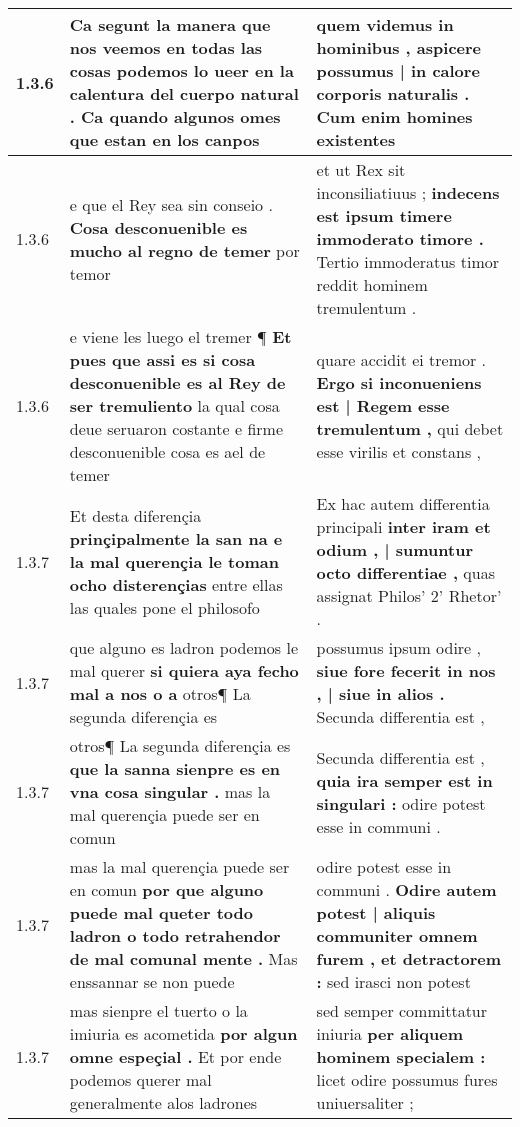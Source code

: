 \begin{tabular}{|p{1cm}|p{6.5cm}|p{6.5cm}|}
1.3.6 & Ca segunt la manera que nos veemos en todas las cosas podemos \textbf{ lo ueer en la calentura del cuerpo natural . } Ca quando algunos omes que estan en los canpos & quem videmus in hominibus , \textbf{ aspicere possumus | in calore corporis naturalis . } Cum enim homines existentes \\\hline
1.3.6 & e que el Rey sea sin conseio . \textbf{ Cosa desconuenible es mucho al regno de temer } por temor & et ut Rex sit inconsiliatiuus ; \textbf{ indecens est ipsum timere immoderato timore . } Tertio immoderatus timor reddit hominem tremulentum . \\\hline
1.3.6 & e viene les luego el tremer ¶ \textbf{ Et pues que assi es si cosa desconuenible es al Rey de ser tremuliento } la qual cosa deue seruaron costante e firme desconuenible cosa es ael de temer & quare accidit ei tremor . \textbf{ Ergo si inconueniens est | Regem esse tremulentum , } qui debet esse virilis et constans , \\\hline
1.3.7 & Et desta diferençia \textbf{ prinçipalmente la san na e la mal querençia le toman ocho disterençias } entre ellas las quales pone el philosofo & Ex hac autem differentia principali \textbf{ inter iram et odium , | sumuntur octo differentiae , } quas assignat Philos’ 2’ Rhetor’ . \\\hline
1.3.7 & que alguno es ladron podemos le mal querer \textbf{ si quiera aya fecho mal a nos o a } otros¶ La segunda diferençia es & possumus ipsum odire , \textbf{ siue fore fecerit in nos , | siue in alios . } Secunda differentia est , \\\hline
1.3.7 & otros¶ La segunda diferençia es \textbf{ que la sanna sienpre es en vna cosa singular . } mas la mal querençia puede ser en comun & Secunda differentia est , \textbf{ quia ira semper est in singulari : } odire potest esse in communi . \\\hline
1.3.7 & mas la mal querençia puede ser en comun \textbf{ por que alguno puede mal queter todo ladron o todo retrahendor de mal comunal mente . } Mas enssannar se non puede & odire potest esse in communi . \textbf{ Odire autem potest | aliquis communiter omnem furem , et detractorem : } sed irasci non potest \\\hline
1.3.7 & mas sienpre el tuerto o la imiuria es acometida \textbf{ por algun omne espeçial . } Et por ende podemos querer mal generalmente alos ladrones & sed semper committatur iniuria \textbf{ per aliquem hominem specialem : } licet odire possumus fures uniuersaliter ; \\\hline

\end{tabular}
